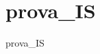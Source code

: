 \chapter{prova\+\_\+\+IS }
\hypertarget{md__r_e_a_d_m_e}{}\label{md__r_e_a_d_m_e}
\label{md__r_e_a_d_m_e_autotoc_md0}%
%


prova\+\_\+\+IS 